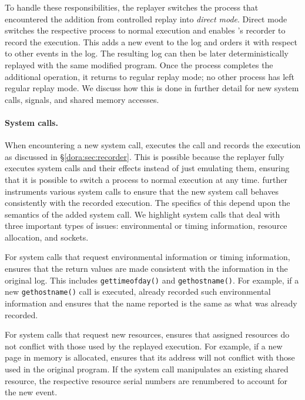 To handle these responsibilities, the replayer switches the process
that encountered the addition from controlled replay into 
\emph{direct mode}.  Direct mode switches the respective process to  
normal execution  and enables {\dora}'s recorder to record the execution.
This adds a new event to the log and orders it
with respect to other events in the log.
The
resulting log can then be later deterministically replayed with the
same modified program.  Once the process completes the additional
operation, it returns to regular replay mode; no other process has
left regular replay mode.  We discuss how this is done in further detail
for new system calls, signals, and shared memory accesses. 

\paragraph{System calls.}
When encountering a new system call, {\dora} executes the
call and records the execution as discussed in \S\ref{dora:sec:recorder}.
This is possible because the replayer fully executes system calls and
their effects instead of just emulating them, ensuring that it is
possible to switch a process to normal execution at any time.
{\dora} further instruments various system calls to ensure that the
new system call behaves consistently with the recorded execution.
The specifics of this depend upon the semantics of the added system
call. We highlight system calls that deal with three important types of issues:
environmental or timing information, resource allocation, and sockets.

For system calls that request environmental information or timing
information, {\dora} ensures that the return values are made
consistent with the information in the original log.  This includes
{\tt gettimeofday()} and {\tt gethostname()}.  For example, if a new
{\tt gethostname()} call is executed, {\dora} already recorded such
environmental information and ensures that the name reported is 
the same as what was already recorded.

For system calls that request new resources, {\dora} ensures that 
assigned resources do not conflict with those used by the replayed
execution.  For example, if a new page in memory is allocated,
{\dora} ensures that its address will not conflict with those used
in the original program.  If the system call manipulates an existing
shared resource, the respective resource serial numbers are renumbered
to account for the new event. 

